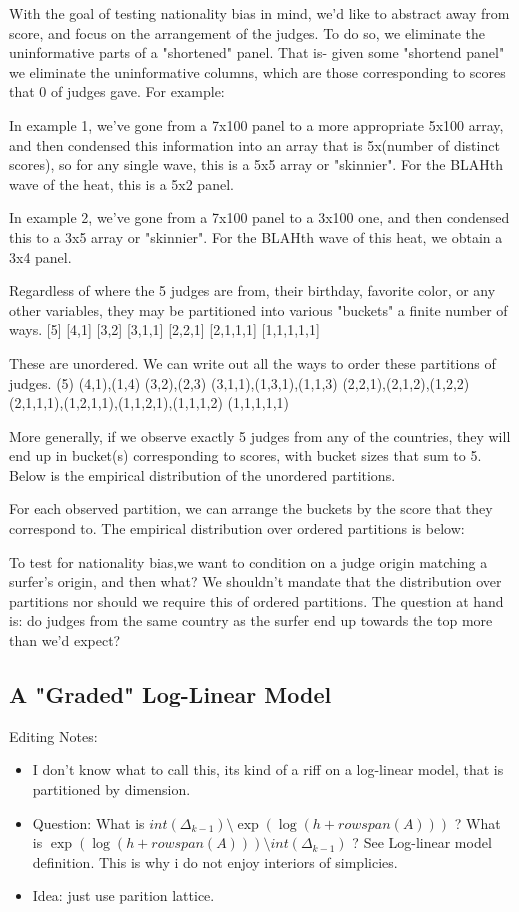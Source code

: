 \documentclass{article}
\begin{document}
With the goal of testing nationality bias in mind, we'd like to abstract away from score, and focus on the arrangement of the judges. To do so, we eliminate the uninformative parts of a "shortened" panel. That is- given some "shortend panel" we eliminate the uninformative columns, which are those corresponding to scores that 0 of judges gave. For example:

In example 1, we've gone from a 7x100 panel to a more appropriate 5x100 array, and then condensed this information into an array that is 5x(number of distinct scores), so for any single wave, this is a 5x5 array or "skinnier". For the BLAHth wave of the heat, this is a 5x2 panel.

In example 2, we've gone from a 7x100 panel to a 3x100 one, and then condensed this to a 3x5 array or "skinnier". For the BLAHth wave of this heat, we obtain a 3x4 panel.

Regardless of where the 5 judges are from, their birthday, favorite color, or any other variables, they may be partitioned into various "buckets" a finite number of ways.
[5]
[4,1]
[3,2]
[3,1,1]
[2,2,1]
[2,1,1,1]
[1,1,1,1,1]

These are unordered. We can write out all the ways to order these partitions of judges.
(5)
(4,1),(1,4)
(3,2),(2,3)
(3,1,1),(1,3,1),(1,1,3)
(2,2,1),(2,1,2),(1,2,2)
(2,1,1,1),(1,2,1,1),(1,1,2,1),(1,1,1,2)
(1,1,1,1,1)

More generally, if we observe exactly 5 judges from any of the countries, they will end up in bucket(s) corresponding to scores, with bucket sizes that sum to 5. Below is the empirical distribution of the unordered partitions.

For each observed partition, we can arrange the buckets by the score that they correspond to. The empirical distribution over ordered partitions is below:


To test for nationality bias,we want to condition on a judge origin matching a surfer's origin, and then what? We shouldn't mandate that the distribution over partitions nor should we require this of ordered partitions. The question at hand is: do judges from the same country as the surfer end up towards the top more than we'd expect?
\subsection{A "Graded" Log-Linear Model}
Editing Notes:
\begin{itemize}
\item I don't know what to call this, its kind of a riff on a log-linear model, that is partitioned by dimension.
\item Question: What is $int(\Delta_{k-1}) \setminus \exp(\log(h+rowspan(A)))$ ? What is $\exp(\log(h+rowspan(A))) \setminus int(\Delta_{k-1})$ ? See Log-linear model definition. This is why i do not enjoy interiors of simplicies.
\item Idea: just use parition lattice.
\end{itemize}
\end{document}

